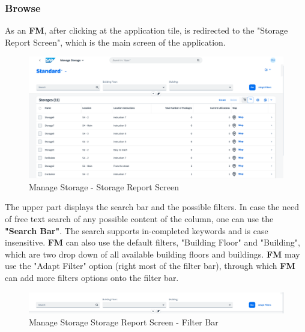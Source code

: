 \subsubsection{Browse}

As an \textbf{FM}, after clicking at the application tile, is redirected to the "Storage Report Screen", which is the main screen of the application. 

\begin{figure}[H]
	\centering
	\includegraphics[width=1\linewidth]{images/user_doc/storage/StorageReportPage/reportDefaultOverview.png}
	\caption{Manage Storage - Storage Report Screen}
	\label{fig:MSstorageReportPage}
\end{figure}

The upper part displays the search bar and the possible filters. 
In case the need of free text search of any possible content of the column, one can use the \textbf{"Search Bar"}. The search supports in-completed keywords and is case insensitive. 
\textbf{FM} can also use the default filters, "Building Floor" and "Building", which are two drop down of all available building floors and buildings. \textbf{FM} may use the "Adapt Filter" option (right most of the filter bar), through which \textbf{FM} can add more filters options onto the filter bar.


\begin{figure}[H]
	\centering
	\includegraphics[width=1\linewidth]{images/user_doc/storage/StorageReportPage/reportFilterBar.png}
	\caption{Manage Storage Storage Report Screen - Filter Bar}
	\label{fig:MCdetailOVerview}
\end{figure}

